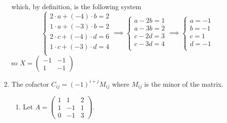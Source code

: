 \documentclass{article}
\newcommand*{\mat}[1]{\begin{pmatrix}#1\end{pmatrix}}
\begin{document}
\begin{enumerate}
{\begin{displaymath}
            \end{displaymath}
            which, by definition, is the following system
            \begin{displaymath}
                \begin{cases}
                    2\cdot a + (-4)\cdot b = 2 \\
                    1\cdot a + (-3)\cdot b = 2 \\
                    2\cdot c + (-4)\cdot d = 6 \\
                    1\cdot c + (-3)\cdot d = 4 \\
                \end{cases}
                \implies
                \begin{cases}
                    a - 2 b = 1 \\
                    a - 3 b = 2 \\
                    c - 2 d = 3 \\
                    c - 3 d = 4 \\
                \end{cases}
                \implies
                \begin{cases}
                    a = -1 \\
                    b = -1 \\
                    c = 1 \\
                    d = -1 \\
                \end{cases}
            \end{displaymath}
            so \(X=\mat{-1 & -1 \\ 1 & -1}\)
        }
        \item {
            The cofactor \(C_{ij} = (-1)^{i+j}M_{ij}\) where \(M_{ij}\) is the minor of the matrix.

            \begin{enumerate}
                \item {
                    Let \(A = \mat{1 & 1 & 2 \\ 1 & -1 & 1 \\ 0 & -1 & 3}\).

}
\end{enumerate}}
\end{enumerate}
\end{document}

